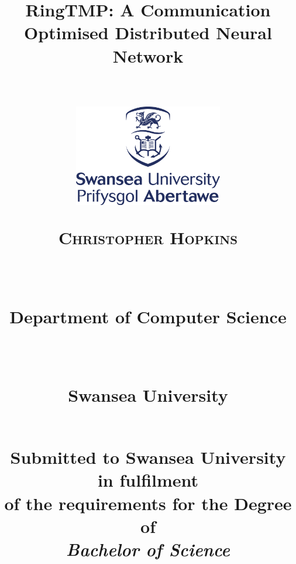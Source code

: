
\newcommand{\horrule}[1]{\rule{\linewidth}{#1}} %
\title{
\begin{Huge}\textbf{RingTMP: A Communication Optimised Distributed Neural Network} \end{Huge} \\%
\vspace{70px}
\includegraphics[width = 65mm]{Figs/new_swansea_logo}\\[8ex]
\begin{large} \textsc{\textbf{Christopher Hopkins }} \end{large} \\ %
\vspace{10px}
\normalfont \normalsize 
\begin{normalsize}Department of Computer Science \end{normalsize}\\  %
\begin{normalsize} Swansea University \end{normalsize} \\ %
\vspace{60px}
Submitted to Swansea University in fulfilment\\ 
of the requirements for the Degree of\\
\textit{Bachelor of Science}
\vspace{20px}
}

